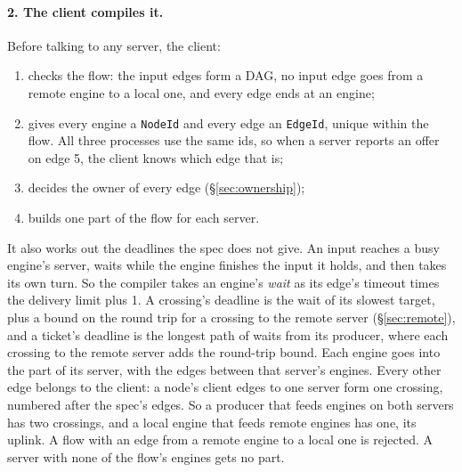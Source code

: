 \documentclass[11pt]{article}
\newcommand{\code}[1]{\texttt{#1}}
\begin{document}
\paragraph{2. The client compiles it.} Before talking to any server, the
client:
\begin{enumerate}[nosep]
  \item checks the flow: the input edges form a DAG, no input edge goes from
        a remote engine to a local one, and every edge ends at an engine;
  \item gives every engine a \code{NodeId} and every edge an \code{EdgeId},
        unique within the flow. All three processes use the same ids, so when
        a server reports an offer on edge 5, the client knows which edge that
        is;
  \item decides the owner of every edge (\S\ref{sec:ownership});
  \item builds one part of the flow for each server.
\end{enumerate}
It also works out the deadlines the spec does not give. An input reaches a
busy engine's server, waits while the engine finishes the input it holds, and
then takes its own turn. So the compiler takes an engine's \emph{wait} as its
edge's timeout times the delivery limit plus 1. A crossing's deadline is the
wait of its slowest target, plus a bound on the round trip for a crossing to
the remote server (\S\ref{sec:remote}), and a ticket's deadline is the
longest path of waits from its producer, where each crossing to the remote
server adds the round-trip bound. Each engine goes into the part of its
server, with the edges between that server's engines. Every other edge
belongs to the client: a node's client edges to one server form one crossing,
numbered after the spec's edges. So a producer that feeds engines on both
servers has two crossings, and a local engine that feeds remote engines has
one, its uplink. A flow with an edge from a remote engine to a local one is
rejected. A server with none of the flow's engines gets no part.
\end{document}
